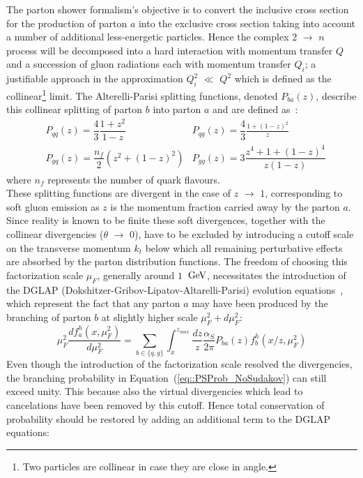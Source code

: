 The parton shower formalism's objective is to convert the inclusive cross section for the production of parton $a$ into the exclusive cross section taking into account a number of additional less-energetic particles.
Hence the complex $2$ $\rightarrow$ $n$ process will be decomposed into a hard interaction with momentum transfer $Q$ and a succession of gluon radiations each with momentum transfer $Q_{i}$; a justifiable approach in the approximation $Q_{i}^{2}$ $\ll$ $Q^2$ which is defined as the collinear\footnote{Two particles are collinear in case they are close in angle.} limit. 
The Alterelli-Parisi splitting functions, denoted $P_{ba}(z)$, describe this collinear splitting of parton $b$ into parton $a$ and are defined as~\cite{}:
\begin{eqnarray}
 & P_{qq}(z) = \dfrac{4}{3} \dfrac{1+z^{2}}{1-z}    & P_{qg}(z) = \dfrac{4}{3} \frac{1+(1-z)^{2}}{z} \\
 & P_{gq}(z) = \dfrac{n_{f}}{2} (z^{2} + (1-z)^{2}) & P_{gg}(z) = 3 \dfrac{z^{4}+1+(1-z)^{4}}{z(1-z)}
\end{eqnarray}
where $n_{f}$ represents the number of quark flavours.
\\
These splitting functions are divergent in the case of $z$ $\rightarrow$ $1$, corresponding to soft gluon emission as $z$ is the momentum fraction carried away by the parton $a$. 
Since reality is known to be finite these soft divergences, together with the collinear divergencies ($\theta$ $\rightarrow$ $0$), have to be excluded by introducing a cutoff scale on the transverse momentum $k_{t}$ below which all remaining perturbative effects are absorbed by the parton distribution functions. 
The freedom of choosing this factorization scale $\mu_{F}$, generally around $1$ $\, \mathrm{GeV}$, necessitates the introduction of the DGLAP (Dokshitzer-Gribov-Lipatov-Altarelli-Parisi) evolution equations~\cite{}, which represent the fact that any parton $a$ may have been produced by the branching of parton $b$ at slightly higher scale $\mu_{F}^2 + d\mu_{F}^2$:\\
\begin{equation}\label{eq::PSProb_NoSudakov}
 \mu_{F}^2 \dfrac{d f_{a}^{h}(x,\mu_{F}^{2})}{d \mu_{F}^{2}} = \sum_{b \in \{q,g\} } \int_{x}^{z_{max}} \dfrac{dz}{z} \dfrac{\alpha_{S}}{2 \pi} P_{ba}(z) f_{b}^{h}(x/z, \mu_{F}^{2})
\end{equation}
Even though the introduction of the factorization scale resolved the divergencies, the branching probability in Equation~(\ref{eq::PSProb_NoSudakov}) can still exceed unity. This because also the virtual divergencies which lead to cancelations have been removed by this cutoff. Hence total conservation of probability should be restored by adding an additional term to the DGLAP equations:
